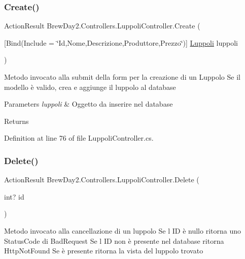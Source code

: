 \subsubsection{\texorpdfstring{Create()}{Create()}\hspace{0.1cm}{\footnotesize\ttfamily [2/2]}}
{\footnotesize\ttfamily Action\+Result Brew\+Day2.\+Controllers.\+Luppoli\+Controller.\+Create (\begin{DoxyParamCaption}\item[{\mbox{[}\+Bind(\+Include = \char`\"{}\+Id,\+Nome,\+Descrizione,\+Produttore,\+Prezzo\char`\"{})\mbox{]} \mbox{\hyperlink{class_brew_day2_1_1_models_1_1_luppoli}{Luppoli}}}]{luppoli }\end{DoxyParamCaption})}



Metodo invocato alla submit della form per la creazione di un Luppolo Se il modello è valido, crea e aggiunge il luppolo al database 


\begin{DoxyParams}{Parameters}
{\em luppoli} & Oggetto da inserire nel database\\
\hline
\end{DoxyParams}
\begin{DoxyReturn}{Returns}

\end{DoxyReturn}


Definition at line 76 of file Luppoli\+Controller.\+cs.

\mbox{\label{class_brew_day2_1_1_controllers_1_1_luppoli_controller_ad7588a964b5bddcd107d96ffd9edb141}} 
\subsubsection{\texorpdfstring{Delete()}{Delete()}}
{\footnotesize\ttfamily Action\+Result Brew\+Day2.\+Controllers.\+Luppoli\+Controller.\+Delete (\begin{DoxyParamCaption}\item[{int?}]{id }\end{DoxyParamCaption})}



Metodo invocato alla cancellazione di un luppolo Se l\textquotesingle{} ID è nullo ritorna uno Status\+Code di Bad\+Request Se l\textquotesingle{} ID non è presente nel database ritorna Http\+Not\+Found Se è presente ritorna la vista del luppolo trovato 


